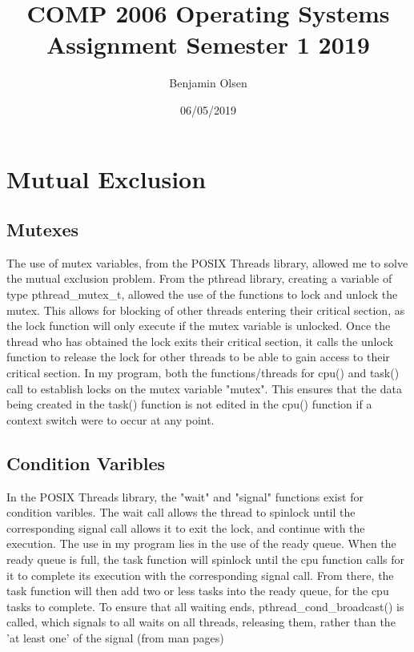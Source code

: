 \documentclass{article}
\title{COMP 2006 Operating Systems Assignment Semester 1 2019}
\date{06/05/2019}
\author{Benjamin Olsen}
\begin{document}
  \maketitle
  \newpage
  \doublespacing
  \tableofcontents
  \singlespacing
  \newpage

  \section{Mutual Exclusion}
    \subsection{Mutexes}
        The use of mutex variables, from the POSIX Threads library, allowed me to solve the mutual exclusion problem.
        From the pthread library, creating a variable of type pthread\_mutex\_t, allowed the use of the functions to lock and unlock the mutex.
        This allows for blocking of other threads entering their critical section, as the lock function will only execute if the mutex variable is unlocked.
        Once the thread who has obtained the lock exits their critical section, it calls the unlock function to release the lock for other threads to be able to gain access to their critical section.
        In my program, both the functions/threads for cpu() and task() call to establish locks on the mutex variable "mutex". This ensures that the data being created in the task() function is not edited in the cpu() function if a context switch were to occur at any point.
    \subsection{Condition Varibles}
      In the POSIX Threads library, the "wait" and "signal" functions exist for condition varibles. The wait call allows the thread to spinlock until the corresponding signal call allows it to exit the lock, and continue with the execution. The use in my program lies in the use of the ready queue. When the ready queue is full, the task function will spinlock until the cpu function calls for it to complete its execution with the corresponding signal call. From there, the task function will then add two or less tasks into the ready queue, for the cpu tasks to complete. To ensure that all waiting ends, pthread\_cond\_broadcast() is called, which signals to all waits on all threads, releasing them, rather than the 'at least one' of the signal (from man pages)
\end{document}
